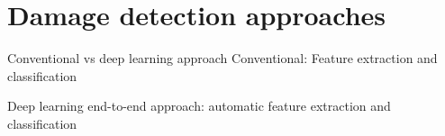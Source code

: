 \documentclass[10pt,aspectratio=169,dvipsnames]{beamer} %
\begin{document}
\section{Damage detection approaches}
\begin{frame}{Conventional vs deep learning approach}
	Conventional: \alert{Feature extraction and classification}
	\begin{figure}
	\end{figure}	
	Deep learning \alert{end-to-end approach: automatic feature extraction and classification}
	\begin{figure}
	\end{figure}
\end{frame}
%
\end{document}
